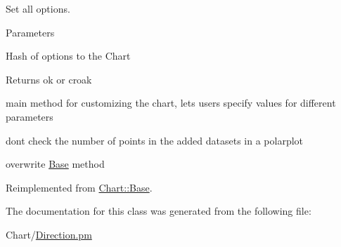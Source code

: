 Set all options. 


\begin{DoxyParams}{Parameters}
\item[\mbox{\tt[in]} {\em \%opts}]Hash of options to the Chart \end{DoxyParams}
\begin{DoxyReturn}{Returns}
ok or croak
\end{DoxyReturn}
main method for customizing the chart, lets users specify values for different parameters\par
 dont check the number of points in the added datasets in a polarplot\par
 overwrite \hyperlink{classChart_1_1Base}{Base} method 

Reimplemented from \hyperlink{classChart_1_1Base_aadd99033eae9eab891cc2abdf7e4b74d}{Chart::Base}.



The documentation for this class was generated from the following file:\begin{DoxyCompactItemize}
\item 
Chart/\hyperlink{Direction_8pm}{Direction.pm}\end{DoxyCompactItemize}
